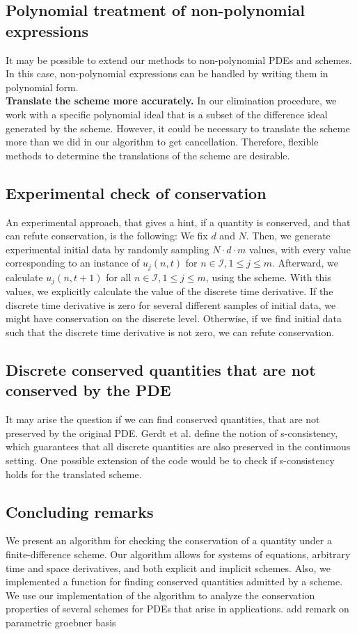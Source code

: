 \documentclass[runningheads]{llncs}
\newcommand{\1}{\chi}
\newcommand{\Ii}{\mathcal{I}}
\begin{document}
\subsection{ Polynomial treatment of non-polynomial expressions}
It may be possible to extend our methods to non-polynomial PDEs and schemes. In this case, non-polynomial expressions can be handled by writing them in polynomial form.\\
{\bf Translate the scheme more accurately.}
In our elimination procedure, we work with a specific polynomial ideal that is a subset of the difference ideal generated by the scheme. However, it could be necessary to translate the scheme more than we did in our algorithm to get cancellation. Therefore, flexible methods to determine the translations of the scheme are desirable.\\
\subsection{Experimental check of conservation}
An experimental approach, that gives a hint, if a quantity is conserved, and that can refute conservation, is the following:
We fix $d$ and $N$. Then, we generate experimental initial data by randomly sampling $N\cdot d\cdot m$ values, with every value corresponding to an instance of $u_j(n,t)$ for $n\in\Ii,1\leq j\leq m$. Afterward, we calculate $u_j(n,t+1)$ for all $n\in\Ii,1\leq j\leq m$, using the scheme. With this values, we explicitly calculate the value of the discrete time derivative.
If the discrete time derivative is zero for several different samples of initial data, we might have conservation on the discrete level. Otherwise, if we find initial data such that the discrete time derivative is not zero, we can refute conservation.\\
\subsection{Discrete conserved quantities that are not conserved by the PDE}
It may arise the question if we can find conserved quantities, that are not preserved by the original PDE. Gerdt et al. \cite{gerdt10,gerdt12} define the notion of s-consistency, which guarantees that all discrete quantities are also preserved in the continuous setting. One possible extension of the code would be to check if s-consistency holds for the translated scheme.\\
\subsection{Concluding remarks}
We present an algorithm for checking the conservation of a quantity under a finite-difference scheme. Our algorithm allows for systems of equations, arbitrary time and space derivatives, and both explicit and implicit schemes. Also, we implemented a function for finding conserved quantities admitted by a scheme. We use our implementation of the algorithm to analyze the conservation properties of several schemes for PDEs that arise in applications. {\color{red} add remark on parametric groebner basis}




\end{document}
